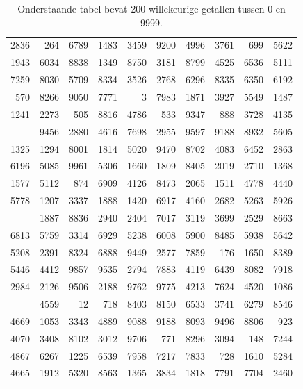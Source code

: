 \documentclass[
]{book}
\begin{document}
\begin{table}[t]

\caption{\label{tab:A1}Onderstaande tabel bevat 200 willekeurige getallen tussen 0 en 9999.}
\centering
\begin{tabular}{rrrrrrrrrr}
\toprule
 &  &  &  &  &  &  &  &  & \\
\midrule
2836 & 264 & 6789 & 1483 & 3459 & 9200 & 4996 & 3761 & 699 & 5622\\
1943 & 6034 & 8838 & 1349 & 8750 & 3181 & 8799 & 4525 & 6536 & 5111\\
7259 & 8030 & 5709 & 8334 & 3526 & 2768 & 6296 & 8335 & 6350 & 6192\\
570 & 8266 & 9050 & 7771 & 3 & 7983 & 1871 & 3927 & 5549 & 1487\\
1241 & 2273 & 505 & 8816 & 4786 & 533 & 9347 & 888 & 3728 & 4135\\
\addlinespace
6688 & 9456 & 2880 & 4616 & 7698 & 2955 & 9597 & 9188 & 8932 & 5605\\
1325 & 1294 & 8001 & 1814 & 5020 & 9470 & 8702 & 4083 & 6452 & 2863\\
6196 & 5085 & 9961 & 5306 & 1660 & 1809 & 8405 & 2019 & 2710 & 1368\\
1577 & 5112 & 874 & 6909 & 4126 & 8473 & 2065 & 1511 & 4778 & 4440\\
5778 & 1207 & 3337 & 1888 & 1420 & 6917 & 4160 & 2682 & 5263 & 5926\\
\addlinespace
6635 & 1887 & 8836 & 2940 & 2404 & 7017 & 3119 & 3699 & 2529 & 8663\\
6813 & 5759 & 3314 & 6929 & 5238 & 6008 & 5900 & 8485 & 5938 & 5642\\
5208 & 2391 & 8324 & 6888 & 9449 & 2577 & 7859 & 176 & 1650 & 8389\\
5446 & 4412 & 9857 & 9535 & 2794 & 7883 & 4119 & 6439 & 8082 & 7918\\
2984 & 2126 & 9506 & 2188 & 9762 & 9775 & 4213 & 7624 & 4520 & 1086\\
\addlinespace
371 & 4559 & 12 & 718 & 8403 & 8150 & 6533 & 3741 & 6279 & 8546\\
4669 & 1053 & 3343 & 4889 & 9088 & 9188 & 8093 & 9496 & 8806 & 923\\
4070 & 3408 & 8102 & 3012 & 9706 & 771 & 8296 & 3094 & 148 & 7244\\
4867 & 6267 & 1225 & 6539 & 7958 & 7217 & 7833 & 728 & 1610 & 5284\\
4665 & 1912 & 5320 & 8563 & 1365 & 3834 & 1818 & 7791 & 7704 & 2460\\
\bottomrule
\end{tabular}
\end{table}
\end{document}
